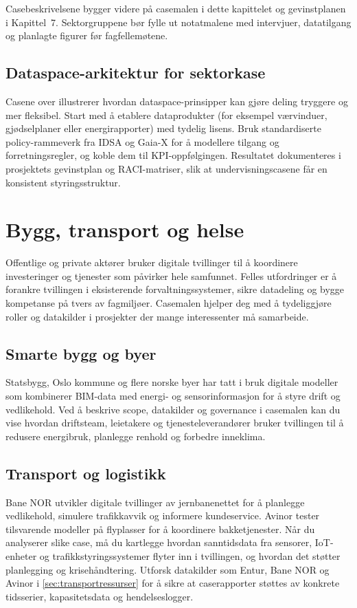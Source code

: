 Casebeskrivelsene bygger videre på casemalen i dette kapittelet og gevinstplanen i Kapittel~7. Sektorgruppene bør fylle ut notatmalene med intervjuer, datatilgang og planlagte figurer før fagfellemøtene.

\subsection*{Dataspace-arkitektur for sektorkase}
Casene over illustrerer hvordan dataspace-prinsipper kan gjøre deling tryggere og mer fleksibel. Start med å etablere dataprodukter (for eksempel værvinduer, gjødselplaner eller energirapporter) med tydelig lisens. Bruk standardiserte policy-rammeverk fra IDSA og Gaia-X for å modellere tilgang og forretningsregler, og koble dem til KPI-oppfølgingen.\citep{idsa2023ram,gaiax2023architecture} Resultatet dokumenteres i prosjektets gevinstplan og RACI-matriser, slik at undervisningscasene får en konsistent styringsstruktur.

\section{Bygg, transport og helse}
Offentlige og private aktører bruker digitale tvillinger til å koordinere investeringer og tjenester som påvirker hele samfunnet. Felles utfordringer er å forankre tvillingen i eksisterende forvaltningssystemer, sikre datadeling og bygge kompetanse på tvers av fagmiljøer. Casemalen hjelper deg med å tydeliggjøre roller og datakilder i prosjekter der mange interessenter må samarbeide.

\subsection*{Smarte bygg og byer}
Statsbygg, Oslo kommune og flere norske byer har tatt i bruk digitale modeller som kombinerer BIM-data med energi- og sensorinformasjon for å styre drift og vedlikehold. Ved å beskrive scope, datakilder og governance i casemalen kan du vise hvordan driftsteam, leietakere og tjenesteleverandører bruker tvillingen til å redusere energibruk, planlegge renhold og forbedre inneklima.

\subsection*{Transport og logistikk}
Bane NOR utvikler digitale tvillinger av jernbanenettet for å planlegge vedlikehold, simulere trafikkavvik og informere kundeservice. Avinor tester tilsvarende modeller på flyplasser for å koordinere bakketjenester. Når du analyserer slike case, må du kartlegge hvordan sanntidsdata fra sensorer, IoT-enheter og trafikkstyringssystemer flyter inn i tvillingen, og hvordan det støtter planlegging og krisehåndtering. Utforsk datakilder som Entur, Bane NOR og Avinor i \autoref{sec:transportressurser} for å sikre at caserapporter støttes av konkrete tidsserier, kapasitetsdata og hendelseslogger.

